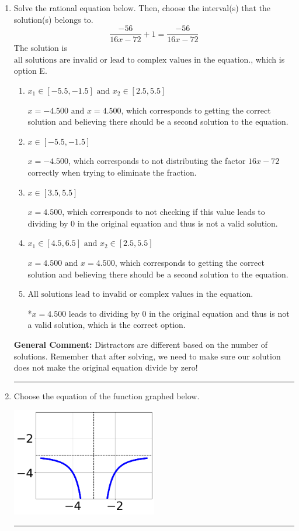\documentclass{extbook}[14pt]
\newcommand{\litem}[1]{\item #1

\rule{\textwidth}{0.4pt}}
\begin{document}
\begin{enumerate}\litem{
Solve the rational equation below. Then, choose the interval(s) that the solution(s) belongs to.
\[ \frac{-56}{16x -72} + 1 = \frac{-56}{16x -72} \]The solution is \( \text{all solutions are invalid or lead to complex values in the equation.} \), which is option E.\begin{enumerate}[label=\Alph*.]
\item \( x_1 \in [-5.5, -1.5] \text{ and } x_2 \in [2.5,5.5] \)

$x = -4.500 \text{ and } x = 4.500$, which corresponds to getting the correct solution and believing there should be a second solution to the equation.
\item \( x \in [-5.5,-1.5] \)

$x = -4.500$, which corresponds to not distributing the factor $16x -72$ correctly when trying to eliminate the fraction.
\item \( x \in [3.5,5.5] \)

$x = 4.500$, which corresponds to not checking if this value leads to dividing by 0 in the original equation and thus is not a valid solution.
\item \( x_1 \in [4.5, 6.5] \text{ and } x_2 \in [2.5,5.5] \)

$x = 4.500 \text{ and } x = 4.500$, which corresponds to getting the correct solution and believing there should be a second solution to the equation.
\item \( \text{All solutions lead to invalid or complex values in the equation.} \)

*$x = 4.500$ leads to dividing by 0 in the original equation and thus is not a valid solution, which is the correct option.
\end{enumerate}

\textbf{General Comment:} Distractors are different based on the number of solutions. Remember that after solving, we need to make sure our solution does not make the original equation divide by zero!
}
\litem{
Choose the equation of the function graphed below.

\begin{center}
    \includegraphics[width=0.5\textwidth]{../Figures/rationalGraphToEquationA.png}
\end{center}


}
\end{enumerate}
\end{document}
